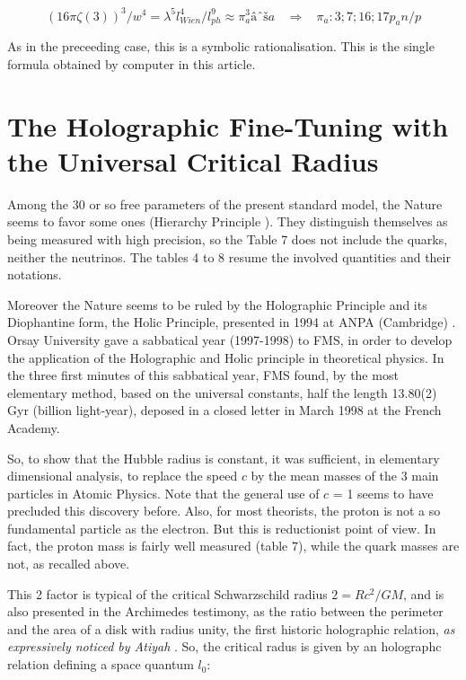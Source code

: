 \documentclass[a4paper,9pt]{article}
\begin{document}
\begin{equation}
(16\pi\zeta(3))^3/w^4 = \lambda^5l_{Wien}^4/l_{ph}^9 \approx \pi_a^3âˆša    ~~~~    \Rightarrow  ~~~~     \pi_a: 3;7;16;17p_an/p
\end{equation}

As in the preceeding case, this is a symbolic rationalisation. This is the single formula obtained by computer in this article.


\section{The Holographic Fine-Tuning with the Universal Critical Radius}

Among the 30 or so free parameters of the present standard model, the Nature seems to favor some ones (Hierarchy Principle \cite{Sanchez}). They distinguish themselves as being measured with high precision, so the Table 7 does not include the quarks, neither the neutrinos. The tables 4 to 8 resume the involved quantities and their notations. 

Moreover the Nature seems to be ruled by the Holographic Principle and its Diophantine form, the Holic Principle, presented in 1994 at ANPA (Cambridge)  \cite{Sanchez1}. Orsay University gave a sabbatical year (1997-1998) to FMS, in order to develop the application of the Holographic and Holic principle in theoretical physics. In the three first minutes of this sabbatical year, FMS found, by the most elementary method, based on the universal constants, half the length 13.80(2) Gyr (billion light-year), deposed in a closed letter in March 1998 at the French Academy. 


So, to show that the Hubble radius is constant, it was sufficient, in elementary dimensional analysis, to replace the speed $c$ by the mean masses of the 3 main particles in Atomic Physics. Note that the general use of $c$ = 1 seems to have precluded this discovery before. Also, for most theorists, the proton is not a so fundamental particle as the electron. But this is reductionist point of view. In fact, the proton mass is fairly well measured (table 7), while the quark masses are not, as recalled above.
 
    This 2 factor is typical of the critical Schwarzschild radius $2 = Rc^2/GM$, and is also presented in the Archimedes testimony, as the ratio between the perimeter and the area of a disk with radius unity, the first historic holographic relation, \textit {as expressively noticed by Atiyah }. So, the critical radus is given by an holographc relation defining a space quantum $l_0$:
    
\end{document}
